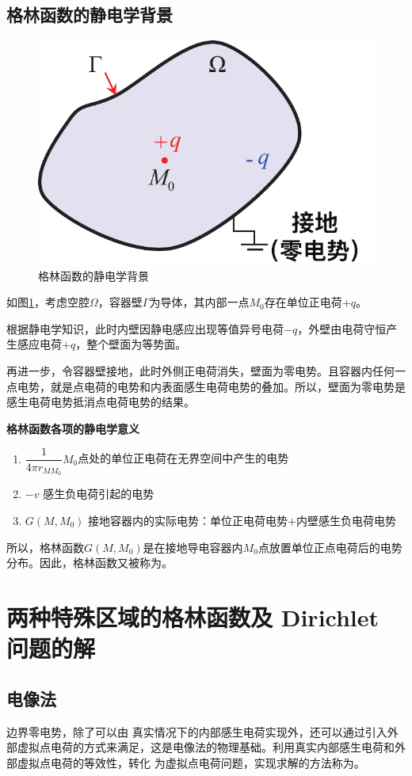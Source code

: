 \subsection{格林函数的静电学背景}
\begin{figure}[!htb]
	\centering
	\includegraphics[width=0.3\linewidth]{pic/格林静电.pdf}
	\caption{格林函数的静电学背景}
	\label{格林静电}
\end{figure}

如图\ref{格林静电}，考虑空腔$\Omega$，容器壁$\Gamma$为导体，其内部一点$M_0$存在单位正电荷$+q$。

根据静电学知识，此时内壁因静电感应出现等值异号电荷$-q$，外壁由电荷守恒产生感应电荷$+q$，整个壁面为等势面。

再进一步，令容器壁接地，此时外侧正电荷消失，壁面为零电势。且容器内任何一点电势，就是点电荷的电势和内表面感生电荷电势的叠加。所以，壁面为零电势是感生电荷电势抵消点电荷电势的结果。

\textbf{格林函数各项的静电学意义}
\begin{enumerate}[\hspace*{2em} 1. ]
	\item $\dfrac{1}{4 \pi r_{MM_0}}$\quad $M_0$点处的单位正电荷在无界空间中产生的电势
	\item $-v$ \quad 感生负电荷引起的电势
	\item $G(M,M_0)$ \quad 接地容器内的实际电势：单位正电荷电势$+$内壁感生负电荷电势
\end{enumerate}

所以，格林函数$G(M,M_0)$是在接地导电容器内$M_0$点放置单位正点电荷后的电势分布。因此，格林函数又被称为。

\section{两种特殊区域的格林函数及 Dirichlet 问题的解}
\subsection{电像法}
边界零电势，除了可以由 真实情况下的内部感生电荷实现外，还可以通过引入外部虚拟点电荷的方式来满足，这是电像法的物理基础。利用真实内部感生电荷和外部虚拟点电荷的等效性，转化
为虚拟点电荷问题，实现求解的方法称为。
\vspace*{0.5em}

